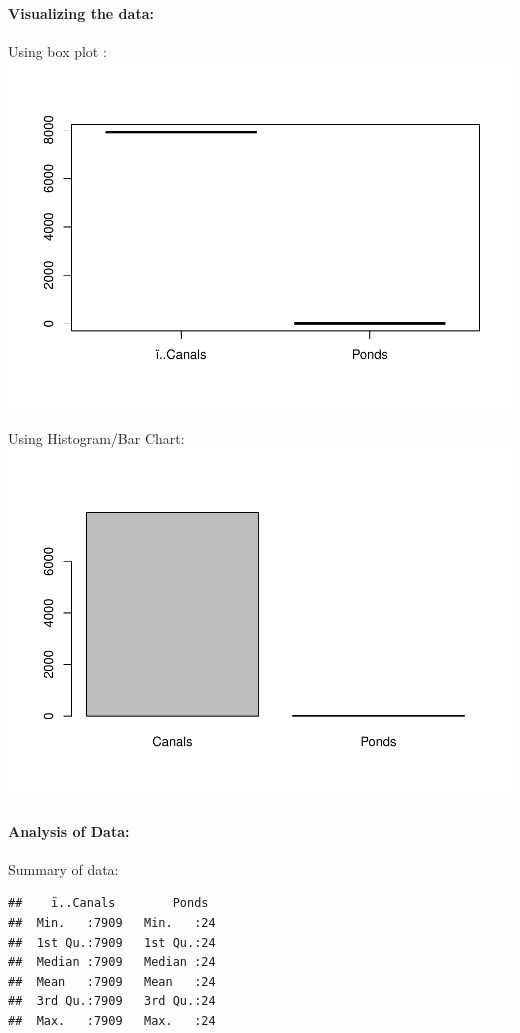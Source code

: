 \documentclass[]{article}
\let\oldparagraph\paragraph
\renewcommand{\paragraph}[1]{\oldparagraph{#1}\mbox{}}
\begin{document}
\paragraph{Visualizing the data:}\label{visualizing-the-data-7}

Using box plot :
\includegraphics{Report_files/figure-latex/unnamed-chunk-30-1.pdf}

Using Histogram/Bar Chart:
\includegraphics{Report_files/figure-latex/unnamed-chunk-31-1.pdf}

\paragraph{Analysis of Data:}\label{analysis-of-data-7}

Summary of data:

\begin{verbatim}
##    ï..Canals        Ponds   
##  Min.   :7909   Min.   :24  
##  1st Qu.:7909   1st Qu.:24  
##  Median :7909   Median :24  
##  Mean   :7909   Mean   :24  
##  3rd Qu.:7909   3rd Qu.:24  
##  Max.   :7909   Max.   :24
\end{verbatim}
\end{document}
